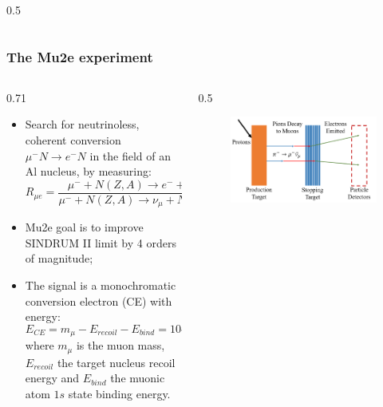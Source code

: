 \documentclass{beamer}
\begin{document}
\begin{frame}
\begin{columns}
\begin{column}{0.5\framewidth}
\begin{figure}[h]
        \end{figure}  
    \end{column}
\end{columns}
\end{frame}




\begin{frame}
    \frametitle{The Mu2e experiment}
    \vspace{-3mm}
\begin{columns}
    \begin{column}{0.71\framewidth}
        \begin{itemize}
            \item Search for neutrinoless, coherent conversion $\mu^- N \rightarrow e^- N$ in the field of an Al nucleus, by measuring: 
            $$R_{\mu e}=\frac{\mu^{-}+N(Z, A) \rightarrow e^{-}+N(Z, A)}{\mu^{-}+N(Z, A) \rightarrow \nu_\mu+N(Z-1, A)}$$
            \item Mu2e goal is to improve SINDRUM II limit by 4 orders of magnitude;
            \item The signal is a monochromatic conversion electron (CE) with energy: 
            $$ E_{CE} = m_\mu - E_{recoil} - E_{bind} = 104.97 \ \text{MeV}$$
            where $m_\mu$ is the muon mass, $E_{recoil}$ the target nucleus recoil energy and $E_{bind}$ the muonic atom $1s$ state binding energy.
        \end{itemize}
    \end{column}
    \begin{column}{0.5\framewidth}
        \begin{figure}[h]
            \centering
            \includegraphics[width=0.9\columnwidth]{figures/png/Screenshot_20240913_161505.png}

\end{figure}
\end{column}
\end{columns}
\end{frame}
\end{document}

